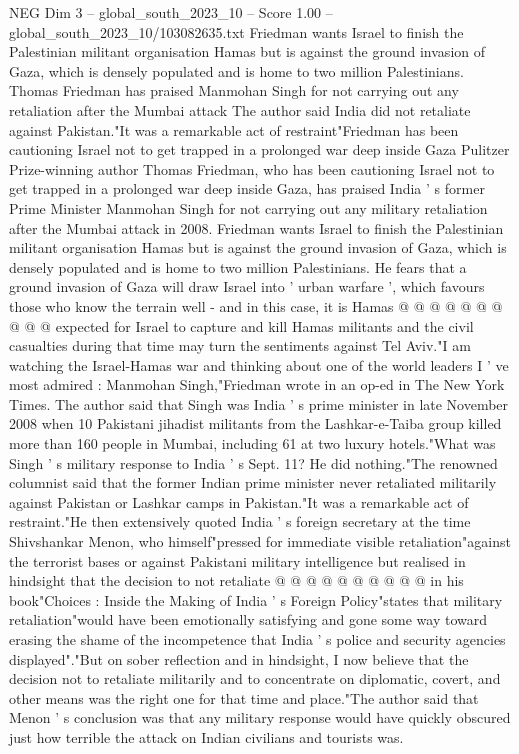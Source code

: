 \begin{textsample}{NEG Dim 3 – global\_south\_2023\_10 – Score 1.00 – global\_south\_2023\_10/103082635.txt}  \label{ex:f3_neg_030}
Friedman wants Israel to finish the Palestinian militant organisation Hamas but is against the ground invasion of Gaza, which is densely populated and is home to two million Palestinians.
Thomas Friedman has praised Manmohan Singh for not carrying out any retaliation after the Mumbai attack The author said India did not retaliate against Pakistan."It was a remarkable act of restraint"Friedman has been cautioning Israel not to get trapped in a prolonged war deep inside Gaza Pulitzer Prize-winning author Thomas Friedman, who has been cautioning Israel not to get trapped in a prolonged war deep inside Gaza, has praised India ' s former Prime Minister Manmohan Singh for not carrying out any military retaliation after the Mumbai attack in 2008.
Friedman wants Israel to finish the Palestinian militant organisation Hamas but is against the ground invasion of Gaza, which is densely populated and is home to two million Palestinians.
He fears that a ground invasion of Gaza will draw Israel into ' urban warfare ', which favours those who know the terrain well - and in this case, it is Hamas @ @ @ @ @ @ @ @ @ @ expected for Israel to capture and kill Hamas militants and the civil casualties during that time may turn the sentiments against Tel Aviv."I am watching the Israel-Hamas war and thinking about one of the world leaders I ' ve most admired : Manmohan Singh,"Friedman wrote in an op-ed in The New York Times.
The author said that Singh was India ' s prime minister in late November 2008 when 10 Pakistani jihadist militants from the Lashkar-e-Taiba group killed more than 160 people in Mumbai, including 61 at two luxury hotels."What was Singh ' s military response to India ' s Sept. 11?
He did nothing."The renowned columnist said that the former Indian prime minister never retaliated militarily against Pakistan or Lashkar camps in Pakistan."It was a remarkable act of restraint."He then extensively quoted India ' s foreign secretary at the time Shivshankar Menon, who himself"pressed for immediate visible retaliation"against the terrorist bases or against Pakistani military intelligence but realised in hindsight that the decision to not retaliate @ @ @ @ @ @ @ @ @ @ in his book"Choices : Inside the Making of India ' s Foreign Policy"states that military retaliation"would have been emotionally satisfying and gone some way toward erasing the shame of the incompetence that India ' s police and security agencies displayed"."But on sober reflection and in hindsight, I now believe that the decision not to retaliate militarily and to concentrate on diplomatic, covert, and other means was the right one for that time and place."The author said that Menon ' s conclusion was that any military response would have quickly obscured just how terrible the attack on Indian civilians and tourists was.

\end{textsample}
